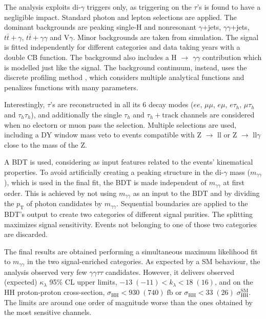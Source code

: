 \documentclass[11pt]{article}
\newcommand{\hgg}{H $\rightarrow$ $\gamma\gamma$}
\newcommand{\kl}{\kappa_{\lambda}}
\newcommand{\mgg}{m_{\gamma\gamma}}
\newcommand{\pt}{p_{\text{T}}}
\newcommand{\ttbar}{t\bar{t}}
\newcommand{\zllg}{Z $\rightarrow$ ll$\gamma$}
\newcommand{\zll}{Z $\rightarrow$ ll}
\begin{document}
The analysis exploits di-\(\gamma\) triggers only, as triggering on the \(\tau\)'s is found to have a negligible impact.
Standard photon and lepton selections are applied.
The dominant backgrounds are peaking single-H and nonresonant \(\gamma\)+jets, \(\gamma \gamma\)+jets, \(\ttbar+\gamma\), \(\ttbar+\gamma\gamma\) and V\(\gamma\).
Minor backgrounds are taken from simulation.
The signal is fitted independently for different categories and data taking years with a double \ac{CB} function.
The background also includes a \hgg{} contribution which is modelled just like the signal.
The background continuum, instead, uses the discrete profiling method \cite{discrete_profiling}, which considers multiple analytical functions and penalizes functions with many parameters.

Interestingly, \(\tau\)’s are reconstructed in all its 6 decay modes (\(ee\), \(\mu\mu\), \(e\mu\), \(e\tau_{h}\), \(\mu\tau_{h}\) and \(\tau_{h}\tau_{h}\)), and additionally the single \(\tau_{h}\) and \(\tau_{h}+\text{track}\) channels are considered when no electorn or muon pass the selection.
Multiple selections are used, including a DY window mass veto to events compatible with \zll{} or \zllg{} close to the mass of the Z.

A \ac{BDT} is used, considering as input features related to the events' kinematical properties.
To avoid artificially creating a peaking structure in the di-\(\gamma\) mass (\(\mgg\)), which is used in the final fit, the \ac{BDT} is made independent of \(\mgg\) at first order.
This is achieved by not using \(\mgg\) as an input to the \ac{BDT} and by dividing the \(\pt\) of photon candidates by \(\mgg\).
Sequential boundaries are applied to the \ac{BDT}'s output to create two categories of different signal purities.
The splitting maximizes signal sensitivity.
Events not belonging to one of those two categories are discarded.

The final results are obtained performing a simultaneous maximum likelihood fit to \(\mgg\) in the two signal-enriched categories.
As expected by a SM behaviour, the analysis observed very few \(\gamma \gamma \tau \tau\) candidates.
However, it delivers observed (expected) \(\kl\) 95\% \ac{CL} upper limits, \(-13\;(-11) < k_{\lambda} < 18\;(16)\), and on the HH proton-proton cross-section, \(\sigma_{\text{HH}} < 930\;(740)\;\si{\femto\barn}\) or \(\sigma_{\text{HH}} < 33\;(26)\;\sigma_{\text{HH}}^{\text{SM}}\).
The limits are around one order of magnitude worse than the ones obtained by the most sensitive channels.
\end{document}
